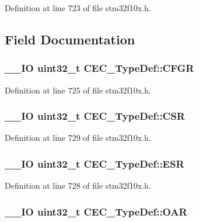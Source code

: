Definition at line 723 of file stm32f10x.\-h.



\subsection{Field Documentation}
\hypertarget{struct_c_e_c___type_def_a91a55cd277c20e5c5ad228fd9013d014}{
\subsubsection[{C\-F\-G\-R}]{\setlength{\rightskip}{0pt plus 5cm}\-\_\-\-\_\-\-I\-O {\bf uint32\-\_\-t} C\-E\-C\-\_\-\-Type\-Def\-::\-C\-F\-G\-R}}\label{struct_c_e_c___type_def_a91a55cd277c20e5c5ad228fd9013d014}


Definition at line 725 of file stm32f10x.\-h.

\hypertarget{struct_c_e_c___type_def_ad9aa13645f701c5457fbf51a9ecf7aa4}{
\subsubsection[{C\-S\-R}]{\setlength{\rightskip}{0pt plus 5cm}\-\_\-\-\_\-\-I\-O {\bf uint32\-\_\-t} C\-E\-C\-\_\-\-Type\-Def\-::\-C\-S\-R}}\label{struct_c_e_c___type_def_ad9aa13645f701c5457fbf51a9ecf7aa4}


Definition at line 729 of file stm32f10x.\-h.

\hypertarget{struct_c_e_c___type_def_a90adcbf5ee626747170b2f208770628f}{
\subsubsection[{E\-S\-R}]{\setlength{\rightskip}{0pt plus 5cm}\-\_\-\-\_\-\-I\-O {\bf uint32\-\_\-t} C\-E\-C\-\_\-\-Type\-Def\-::\-E\-S\-R}}\label{struct_c_e_c___type_def_a90adcbf5ee626747170b2f208770628f}


Definition at line 728 of file stm32f10x.\-h.

\hypertarget{struct_c_e_c___type_def_aa578935e8a0795a0a7494f4d281bc43d}{
\subsubsection[{O\-A\-R}]{\setlength{\rightskip}{0pt plus 5cm}\-\_\-\-\_\-\-I\-O {\bf uint32\-\_\-t} C\-E\-C\-\_\-\-Type\-Def\-::\-O\-A\-R}}\label{struct_c_e_c___type_def_aa578935e8a0795a0a7494f4d281bc43d}


